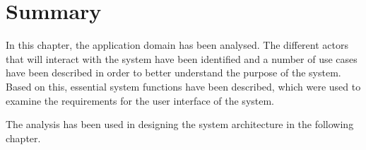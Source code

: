 \section{Summary} \label{ssc:ad_summary}
In this chapter, the application domain has been analysed. The different actors that will interact with the system have been identified and a number of use cases have been described in order to better understand the purpose of the system. Based on this, essential system functions have been described, which were used to examine the requirements for the user interface of the system. 
\par
The analysis has been used in designing the system architecture in the following chapter.